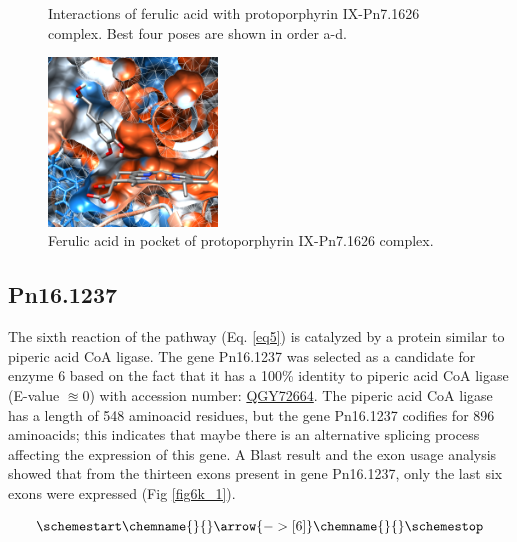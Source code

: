 \documentclass[12pt]{article}
\begin{document}
\begin{figure}[h!]
\begin{subfigure}[h!]{0.35\textwidth}
			\caption{}
		\end{subfigure}
		\hfill
		\caption[Interactions between ferulic acid and protoporphyrin IX-Pn7.1626 complex.]{Interactions of ferulic acid with protoporphyrin IX-Pn7.1626 complex. Best four poses are shown in order a-d.}
		\label{fig5p_5}
	\end{figure}
	\FloatBarrier
	
	\FloatBarrier
	\begin{figure}[h!]
		\centering
		\includegraphics[width=0.4\textwidth]{../5/propose/Dock/Dock2/chimera.png}
		\caption{Ferulic acid in pocket of protoporphyrin IX-Pn7.1626 complex.}
		\label{fig5p_6}
	\end{figure}
	\FloatBarrier
	
	\subsection{Pn16.1237}
	
	The sixth reaction of the pathway (Eq. \ref{eq5}) is catalyzed by a protein similar to piperic acid CoA ligase. The gene Pn16.1237 was selected as a candidate for enzyme 6 based on the fact that it has a 100\% identity to piperic acid CoA ligase (E-value $\approxeq 0$) with accession number: \href{https://www.ncbi.nlm.nih.gov/protein/QGY72664.1/}{QGY72664}. The piperic acid CoA ligase has a length of 548 aminoacid residues, but the gene Pn16.1237 codifies for 896 aminoacids; this indicates that maybe there is an alternative splicing process affecting the expression of this gene. A Blast result and the exon usage analysis showed that from the thirteen exons present in gene Pn16.1237, only the last six exons were expressed (Fig \ref{fig6k_1}).
	
	\begin{equation}
	\schemestart
	\chemname{\footnotesize}{\vspace{-100pt}}\arrow{->[ 6]}\chemname{\footnotesize}{\vspace{-100pt}}
	\label{eq5}
	\schemestop
	\end{equation}\\
	
\end{document}
